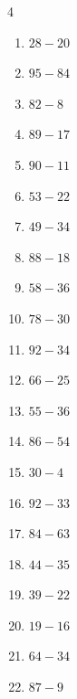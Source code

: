\begin{multicols}{4}
\begin{enumerate}
  \item $28-20$
        \phantom{$=8$}

  \item $95-84$
        \phantom{$=11$}

  \item $82-8$
        \phantom{$=74$}

  \item $89-17$
        \phantom{$=72$}

  \item $90-11$
        \phantom{$=79$}

  \item $53-22$
        \phantom{$=31$}

  \item $49-34$
        \phantom{$=15$}

  \item $88-18$
        \phantom{$=70$}

  \item $58-36$
        \phantom{$=22$}

  \item $78-30$
        \phantom{$=48$}

  \item $92-34$
        \phantom{$=58$}

  \item $66-25$
        \phantom{$=41$}

  \item $55-36$
        \phantom{$=19$}

  \item $86-54$
        \phantom{$=32$}

  \item $30-4$
        \phantom{$=26$}

  \item $92-33$
        \phantom{$=59$}

  \item $84-63$
        \phantom{$=21$}

  \item $44-35$
        \phantom{$=9$}

  \item $39-22$
        \phantom{$=17$}

  \item $19-16$
        \phantom{$=3$}

  \item $64-34$
        \phantom{$=30$}

  \item $87-9$
        \phantom{$=78$}


\end{enumerate}
\end{multicols}
